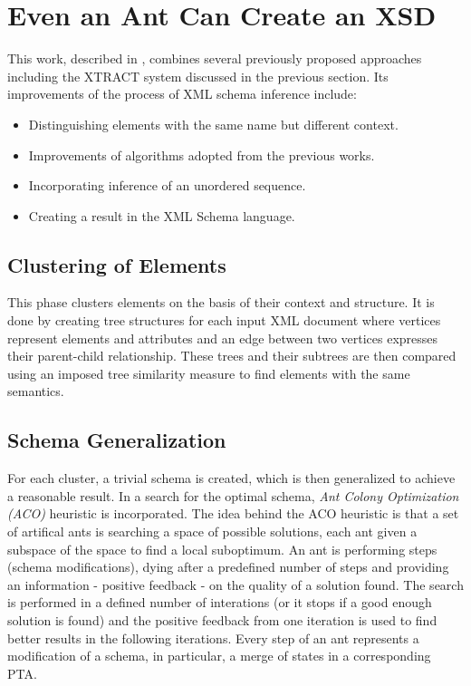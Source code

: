 \section{Even an Ant Can Create an XSD} \label{section_even_an_ant_can_create_an_xsd}
This work, described in \cite{Vosta:2008:EAC:1802514.1802522}, combines several previously proposed approaches including the XTRACT system discussed in the previous section. Its improvements of the process of XML schema inference include:

\begin{itemize}
\item Distinguishing elements with the same name but different context.
\item Improvements of algorithms adopted from the previous works.
\item Incorporating inference of an unordered sequence.
\item Creating a result in the XML Schema language.
\end{itemize}

\subsection{Clustering of Elements}
This phase clusters elements on the basis of their context and structure. It is done by creating tree structures for each input XML document where vertices represent elements and attributes and an edge between two vertices expresses their parent-child relationship. These trees and their subtrees are then compared using an imposed tree similarity measure to find elements with the same semantics.

\subsection{Schema Generalization}
For each cluster, a trivial schema is created, which is then generalized to achieve a reasonable result. In a search for the optimal schema, \emph{Ant Colony Optimization (ACO)} heuristic is incorporated. The idea behind the ACO heuristic is that a set of artifical ants is searching a space of possible solutions, each ant given a subspace of the space to find a local suboptimum. An ant is performing steps (schema modifications), dying after a predefined number of steps and providing an information - positive feedback - on the quality of a solution found. The search is performed in a defined number of interations (or it stops if a good enough solution is found) and the positive feedback from one iteration is used to find better results in the following iterations. Every step of an ant represents a modification of a schema, in particular, a merge of states in a corresponding PTA.

